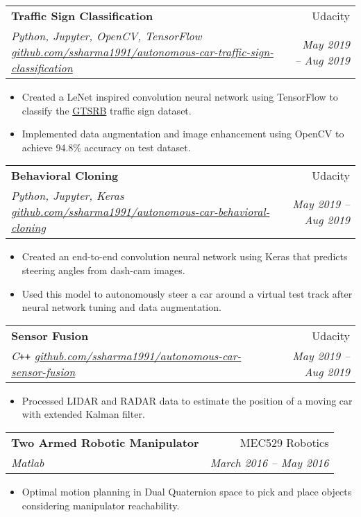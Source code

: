 \documentclass[letterpaper,10pt]{article}
\makeatletter
\newcommand{\resumeHeading}[4]{
  \vspace{-1pt}
    \begin{tabular*}{0.97\textwidth}{l@{\extracolsep{\fill}}r}
      \textbf{#1} & #2 \vspace{-2pt}\\ \vspace{1pt}
      \textit{\small#3} & \textit{\small #4} \\
    \end{tabular*}
}
\newcommand{\resumeItemListStart}{
\vspace{-7pt}
\begin{itemize}[leftmargin=14pt]
}
\newcommand{\resumeItemListEnd}{
\vspace{+7pt}
\end{itemize}
}
\newcommand{\resumeItem}[1]{
  \item\small{
      {#1 \vspace{-7pt}
      }
  }
}
\makeatother
\begin{document}
	\vspace{-2pt}
	\resumeHeading{Traffic Sign Classification}{Udacity}{Python, Jupyter, OpenCV, TensorFlow \href{https://github.com/ssharma1991/autonomous-car-traffic-sign-classification}{github.com/ssharma1991/autonomous-car-traffic-sign-classification}}{May 2019 -- Aug 2019}
	\resumeItemListStart
	\resumeItem{Created a LeNet inspired convolution neural network using TensorFlow to classify the \href{http://benchmark.ini.rub.de/?section=gtsrb}{GTSRB} traffic sign dataset.}
	\resumeItem{Implemented data augmentation and image enhancement using OpenCV to achieve 94.8\% accuracy on test dataset.}
	\resumeItemListEnd
	
	\vspace{-2pt}
	\resumeHeading{Behavioral Cloning}{Udacity}{Python, Jupyter, Keras \href{https://github.com/ssharma1991/autonomous-car-behavioral-cloning}{github.com/ssharma1991/autonomous-car-behavioral-cloning}}{May 2019 -- Aug 2019}
	\resumeItemListStart
	\resumeItem{Created an end-to-end convolution neural network using Keras that predicts steering angles from dash-cam images.}
	\resumeItem{Used this model to autonomously steer a car  around a virtual test track after neural network tuning and data augmentation.}
	\resumeItemListEnd
	
	\vspace{-2pt}
	\resumeHeading{Sensor Fusion}{Udacity}{C\texttt{++} \href{https://github.com/ssharma1991/autonomous-car-sensor-fusion}{github.com/ssharma1991/autonomous-car-sensor-fusion}}{May 2019 -- Aug 2019}
	\resumeItemListStart
	\resumeItem{Processed LIDAR and RADAR data to estimate the position of a moving car with extended Kalman filter.}
	\resumeItemListEnd
	
	
	\vspace{-2pt}
	\resumeHeading{Two Armed Robotic Manipulator}{MEC529 Robotics}{Matlab}{March 2016 -- May 2016}
	\resumeItemListStart
	\resumeItem{Optimal motion planning in Dual Quaternion space to pick and place objects considering manipulator reachability.}
	\resumeItemListEnd
	
\end{document}

